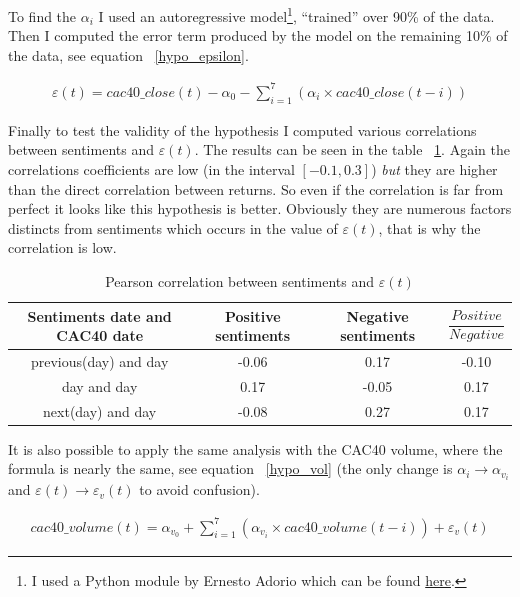 \documentclass[12pt]{report}
\begin{document}
			To find the $\alpha_i$ I used an autoregressive model\footnote{I used a Python module by Ernesto Adorio which can be found \href{http://adorio-research.org/wordpress/?p=4551}{here}.}, ``trained'' over 90\% of the data. Then I computed the error term produced by the model on the remaining 10\% of the data, see equation ~\ref{hypo_epsilon}.

			\begin{eqnarray}
				\varepsilon(t) = cac40\_close(t) - \alpha_0 - \sum_{i = 1}^{7} \left(\alpha_i\times{}cac40\_close(t - i)\right)\label{hypo_epsilon}
			\end{eqnarray}

			Finally to test the validity of the hypothesis I computed various correlations between sentiments and $\varepsilon(t)$. The results can be seen in the table ~\ref{pearson_cac_ar}. Again the correlations coefficients are low (in the interval $[-0.1, 0.3]$) \emph{but} they are higher than the direct correlation between returns. So even if the correlation is far from perfect it looks like this hypothesis is better. Obviously they are numerous factors distincts from sentiments which occurs in the value of $\varepsilon(t)$, that is why the correlation is low.

			\begin{table}
			\begin{tabular}{|c || c | c | c|}
				\hline
				Sentiments date and CAC40 date & Positive sentiments & Negative sentiments & $\dfrac{Positive}{Negative}$\\
				\hline
				previous(day) and day & -0.06 & 0.17 & -0.10\\
				\hline
				day and day & 0.17 & -0.05 & 0.17\\
				\hline
				next(day) and day & -0.08 & 0.27 & 0.17\\
				\hline
			\end{tabular}

			\caption{Pearson correlation between sentiments and $\varepsilon(t)$\label{pearson_cac_ar}}
			\end{table}

			It is also possible to apply the same analysis with the CAC40 volume, where the formula is nearly the same, see equation ~\ref{hypo_vol} (the only change is $\alpha_i \rightarrow \alpha_{v_i}$ and $\varepsilon(t) \rightarrow \varepsilon_v(t)$ to avoid confusion).

			\begin{eqnarray}
				cac40\_volume(t) = \alpha_{v_0} + \sum_{i = 1}^{7}\left(\alpha_{v_i}\times{}cac40\_volume(t - i)\right) + \varepsilon_v(t)\label{hypo_vol}
			\end{eqnarray}
\end{document}
